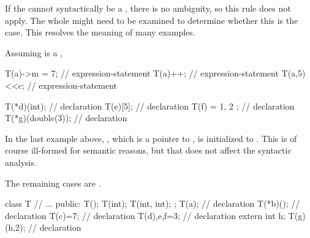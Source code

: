 \pnum
\begin{note}
If the  cannot syntactically be a
, there is no ambiguity,
so this rule does not apply.
The whole  might need to be examined
to determine whether this is the case. This resolves the meaning
of many examples.
\begin{example}
Assuming  is a
,

\begin{codeblock}
T(a)->m = 7;        // expression-statement
T(a)++;             // expression-statement
T(a,5)<<c;          // expression-statement

T(*d)(int);         //  declaration
T(e)[5];            //  declaration
T(f) = { 1, 2 };    //  declaration
T(*g)(double(3));   //  declaration
\end{codeblock}

In the last example above, , which is a pointer to ,
is initialized to . This is of course ill-formed for
semantic reasons, but that does not affect the syntactic analysis.
\end{example}

The remaining cases are .
\begin{example}

\begin{codeblock}
class T {
  // ...
public:
  T();
  T(int);
  T(int, int);
};
T(a);               //  declaration
T(*b)();            //  declaration
T(c)=7;             //  declaration
T(d),e,f=3;         //  declaration
extern int h;
T(g)(h,2);          //  declaration
\end{codeblock}
\end{example}
\end{note}

